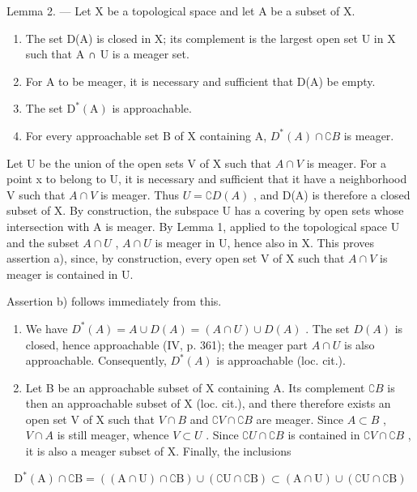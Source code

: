 Lemma 2. --- Let X be a topological space and let A be a subset of X.

\begin{enumerate}
\def\labelenumi{\alph{enumi})}
\item
  The set D(A) is closed in X; its complement is the largest open set U in X such that A ∩ U is a meager set.
\item
  For A to be meager, it is necessary and sufficient that D(A) be empty.
\item
  The set \(\mathrm{D}^{*}(\mathrm{A})\) is approachable.
\item
  For every approachable set B of X containing A, \(D^{*}(A) \cap \complement B\) is meager.
\end{enumerate}

Let U be the union of the open sets V of X such that \(A \cap V\) is meager. For a point x to belong to U, it is necessary and sufficient that it have a neighborhood V such that \(A \cap V\) is meager. Thus \(U = \complement D(A)\) , and D(A) is therefore a closed subset of X. By construction, the subspace U has a covering by open sets whose intersection with A is meager. By Lemma 1, applied to the topological space U and the subset \(A \cap U\) , \(A \cap U\) is meager in U, hence also in X. This proves assertion a), since, by construction, every open set V of X such that \(A \cap V\) is meager is contained in U.

Assertion b) follows immediately from this.

\begin{enumerate}
\def\labelenumi{\alph{enumi})}
\setcounter{enumi}{2}
\item
  We have \(D^{*}(A) = A \cup D(A) = (A \cap U) \cup D(A)\) . The set \(D(A)\) is closed, hence approachable (IV, p. 361); the meager part \(A \cap U\) is also approachable. Consequently, \(D^{*}(A)\) is approachable (loc. cit.).
\item
  Let B be an approachable subset of X containing A. Its complement \(\complement B\) is then an approachable subset of X (loc. cit.), and there therefore exists an open set V of X such that \(V \cap B\) and \(\complement V \cap \complement B\) are meager. Since \(A \subset B\) , \(V \cap A\) is still meager, whence \(V \subset U\) . Since \(\complement U \cap \complement B\) is contained in \(\complement V \cap \complement B\) , it is also a meager subset of X. Finally, the inclusions
\end{enumerate}

\[
\mathrm{D} ^ {*} (\mathrm{A}) \cap \complement \mathrm{B} = ((\mathrm{A} \cap \mathrm{U}) \cap \complement \mathrm{B}) \cup (\complement \mathrm{U} \cap \complement \mathrm{B}) \subset (\mathrm{A} \cap \mathrm{U}) \cup (\complement \mathrm{U} \cap \complement \mathrm{B})
\]

